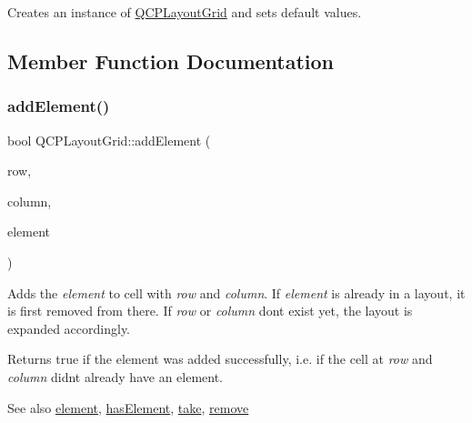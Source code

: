 Creates an instance of \hyperlink{class_q_c_p_layout_grid}{Q\+C\+P\+Layout\+Grid} and sets default values. 

\subsection{Member Function Documentation}
\hypertarget{class_q_c_p_layout_grid_adff1a2ca691ed83d2d24a4cd1fe17012}{}\label{class_q_c_p_layout_grid_adff1a2ca691ed83d2d24a4cd1fe17012} 
\subsubsection{\texorpdfstring{add\+Element()}{addElement()}}
{\footnotesize\ttfamily bool Q\+C\+P\+Layout\+Grid\+::add\+Element (\begin{DoxyParamCaption}\item[{int}]{row,  }\item[{int}]{column,  }\item[{\hyperlink{class_q_c_p_layout_element}{Q\+C\+P\+Layout\+Element} $\ast$}]{element }\end{DoxyParamCaption})}

Adds the {\itshape element} to cell with {\itshape row} and {\itshape column}. If {\itshape element} is already in a layout, it is first removed from there. If {\itshape row} or {\itshape column} don\textquotesingle{}t exist yet, the layout is expanded accordingly.

Returns true if the element was added successfully, i.\+e. if the cell at {\itshape row} and {\itshape column} didn\textquotesingle{}t already have an element.

\begin{DoxySeeAlso}{See also}
\hyperlink{class_q_c_p_layout_grid_a602b426609b4411cf6a93c3ddf3a381a}{element}, \hyperlink{class_q_c_p_layout_grid_ab0cf4f7edc9414a3bfaddac0f46dc0a0}{has\+Element}, \hyperlink{class_q_c_p_layout_grid_a666a9fe9e92054436f9b66eba25cca0c}{take}, \hyperlink{class_q_c_p_layout_a6c58f537d8086f352576ab7c5b15d0bc}{remove} 
\end{DoxySeeAlso}
\hypertarget{class_q_c_p_layout_grid_a1a2962cbf45011405b64b913afa8e7a2}{}\label{class_q_c_p_layout_grid_a1a2962cbf45011405b64b913afa8e7a2} 
